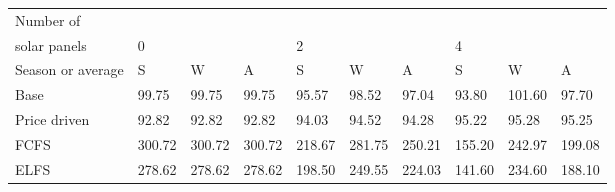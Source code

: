 \begin{table}[h] 
\centering 
\begin{tabular}{l|lll|lll|lll}Number of \\ solar panels&0& & &2& & &4& & \\ \hline 
Season or average & S & W & A & S & W & A & S & W & A \\ \hline 
Base&99.75&99.75&99.75&95.57&98.52&97.04&93.80&101.60&97.70 \\ 
Price driven&92.82&92.82&92.82&94.03&94.52&94.28&95.22&95.28&95.25 \\ 
FCFS&300.72&300.72&300.72&218.67&281.75&250.21&155.20&242.97&199.08 \\ 
ELFS&278.62&278.62&278.62&198.50&249.55&224.03&141.60&234.60&188.10 \\ 
\end{tabular} 
\end{table}